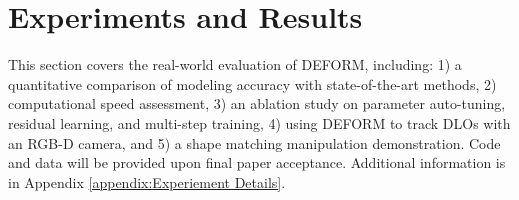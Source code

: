 \section{Experiments and Results}
\label{sec:experiments}
This section covers the real-world evaluation of DEFORM, including: 1) a quantitative comparison of modeling accuracy with state-of-the-art methods, 2) computational speed assessment, 3) an ablation study on parameter auto-tuning, residual learning, and multi-step training, 4) using DEFORM to track DLOs with an RGB-D camera, and 5) a shape matching manipulation demonstration. 
Code and data will be provided upon final paper acceptance. 
Additional information is in Appendix \ref{appendix:Experiement Details}.
